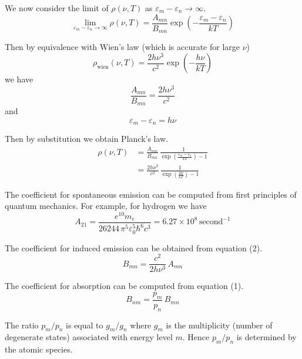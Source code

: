 \documentclass[12pt]{article}
\newcommand\BNM{B_{nm}} %
\newcommand\BMN{B_{mn}} %
\newcommand\AMN{A_{mn}} %
\newcommand\RHO{\rho(\nu,T)}
\begin{document}
\noindent
We now consider the limit of $\RHO$ as $\varepsilon_m-\varepsilon_n\rightarrow\infty$.
\begin{equation*}
\lim_{\varepsilon_m-\varepsilon_n\rightarrow\infty}\RHO
=\frac{\AMN}{\BMN}\exp\left(-\frac{\varepsilon_m-\varepsilon_n}{kT}\right)
\end{equation*}

\noindent
Then by equivalence with Wien's law (which is accurate for large $\nu$)
\begin{equation*}
\rho_\text{wien}(\nu,T)=\frac{2h\nu^3}{c^2}\exp\left(-\frac{h\nu}{kT}\right)
\end{equation*}
we have
\begin{equation*}
\frac{\AMN}{\BMN}=\frac{2h\nu^3}{c^2}
\tag{2}
\end{equation*}
and
\begin{equation*}
\varepsilon_m-\varepsilon_n=h\nu
\end{equation*}

\noindent
Then by substitution we obtain Planck's law.
\begin{align*}
\RHO
&=\frac{\AMN}{\BMN}\,\frac{1}{\exp\left(\frac{\varepsilon_m-\varepsilon_n}{kT}\right)-1}
\\[2ex]
&=\frac{2h\nu^3}{c^2}\,\frac{1}{\exp\left(\frac{h\nu}{kT}\right)-1}
\end{align*}

\bigskip
\noindent
The coefficient for spontaneous emission can be computed from first principles of quantum mechanics.
For example, for hydrogen we have
\begin{equation*}
A_{21}=\frac{e^{10}m_e}{26244\,\pi^5\varepsilon_0^5\hbar^6 c^3}
=6.27\times10^8\,\text{second}^{-1}
\end{equation*}

\noindent
The coefficient for induced emission can be obtained from equation (2).
\begin{equation*}
\BMN=\frac{c^2}{2h\nu^3}\,\AMN
\end{equation*}

\noindent
The coefficient for absorption can be computed from equation (1).
\begin{equation*}
\BNM=\frac{p_m}{p_n}\,\BMN
\end{equation*}

\noindent
The ratio $p_m/p_n$ is equal to $g_m/g_n$
where $g_m$ is the multiplicity (number of degenerate states)
associated with energy level $m$.
Hence $p_m/p_n$ is determined by the atomic species.
\end{document}
